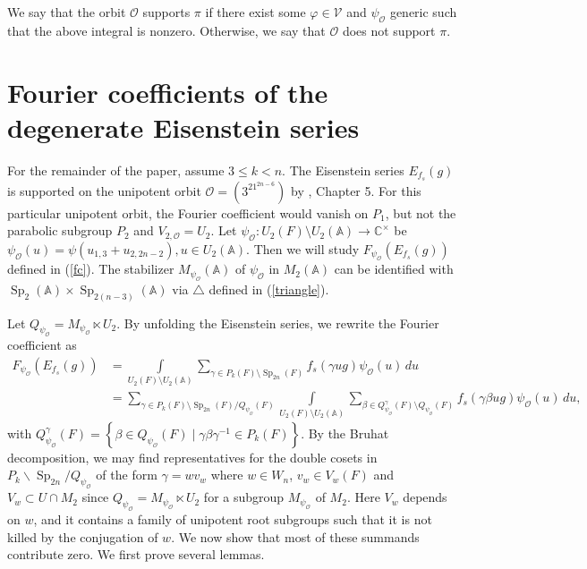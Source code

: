 \documentclass[11pt,notitlepage]{amsart}
\theoremstyle{definition}
\theoremstyle{remark}
\newcommand{\calO}{\mathcal{O}}
\newcommand{\calV}{\mathcal{V}}
\newcommand{\bbA}{\mathbb{A}}
\newcommand{\bbC}{\mathbb{C}}
\DeclareMathOperator{\Sp}{Sp}
\begin{document}
We say that the orbit $\calO$ supports $\pi$ if there exist some $\varphi\in \calV$ and $\psi_\calO$ generic such that the above integral is nonzero. Otherwise, we say that $\calO$ does not support $\pi$.

\section{Fourier coefficients of the degenerate Eisenstein series}
For the remainder of the paper, assume $3 \leqslant k < n$.
The Eisenstein series $E_{f_s}(g)$ is supported on the unipotent orbit $\calO  = (3^21^{2n-6})$ by \cite{GIN06}, Chapter 5. For this particular unipotent orbit, the Fourier coefficient would vanish on $P_1$, but not the parabolic subgroup $P_2 $ and $V_{2,\calO} = U_2$. Let $\psi_\calO: U_2(F)\setminus U_2(\bbA)\rightarrow \bbC^\times$ be 
  $\psi_\calO(u) = \psi(u_{1,3} + u_{2,{2n-2}}), u\in U_2(\bbA)$. Then we will study $F_{\psi_\calO}(E_{f_s}(g))$ defined in (\ref{fc}). The stabilizer $M_{\psi_\calO}(\bbA)$ of $\psi_\calO$ in $M_{2}(\bbA)$ can be identified with $\Sp_{2}(\bbA)\times \Sp_{2(n-3)}(\bbA)$ via $\triangle$ defined in (\ref{triangle}).

Let $Q_{\psi_\calO} = M_{\psi_\calO}\ltimes U_2$. By unfolding the Eisenstein series, we rewrite the Fourier coefficient as
\begin{equation}\label{int400}
    \begin{split}
      F_{\psi_\calO}(E_{f_s}(g)) &= \int\limits_{U_2(F)\setminus U_2(\bbA)} \sum_{\gamma\in P_k(F)\setminus \Sp_{2n}(F)}f_s(\gamma ug)\psi_\calO(u)\, du\\
      &= \sum_{\gamma \in P_k(F)\setminus \Sp_{2n}(F)/Q_{\psi_\calO}(F)} \int\limits_{U_2(F)\setminus U_2(\bbA)}  \sum_{\beta \in Q_{\psi_\calO}^\gamma(F)\setminus Q_{\psi_\calO}(F)} f_s(\gamma\beta u g )\psi_\calO(u)\, du,
    \end{split}
\end{equation}
with $Q_{\psi_\calO}^\gamma(F) =\left\{\beta\in Q_{\psi_\calO}(F)\mid \gamma\beta\gamma^{-1} \in P_k(F)\right\}$. By the Bruhat decomposition, we may find representatives for the double cosets in $P_{k}\backslash \Sp_{2n}/Q_{\psi_\calO}$ of the form $\gamma =wv_w$ where $w\in W_n$, $v_w\in V_w(F)$ and $V_w\subset U\cap M_2$ since $Q_{\psi_{\calO}}=M_{\psi_\calO}\ltimes U_2 $ for a subgroup $M_{\psi_\calO}$ of $M_2$. Here $V_w$ depends on $w$, and it contains a family of unipotent root subgroups such that it is not killed by the conjugation of $w$. 
We now show that most of these summands contribute zero. We first prove several lemmas.
\end{document}

